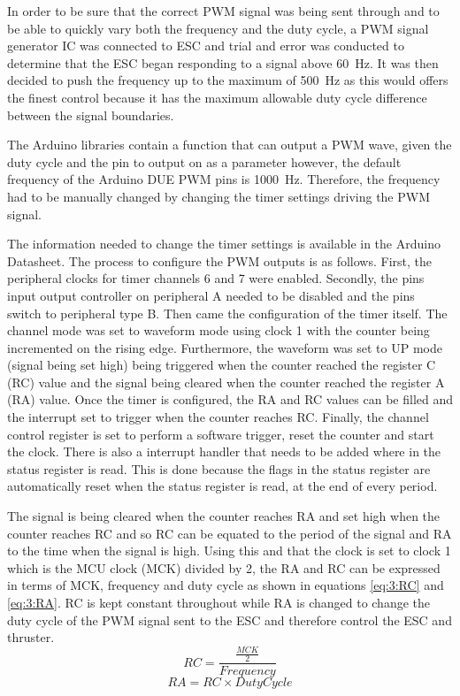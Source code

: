 		\vspace{0.4cm}
		In order to be sure that the correct PWM signal was being sent through and to be able to quickly vary both the frequency and the duty cycle, a PWM signal generator IC was connected to ESC and trial and error was conducted to determine that the ESC began responding to a signal above \SI{60}{\hertz}. It was then decided to push the frequency up to the maximum of \SI{500}{\hertz} as this would offers the finest control because it has the maximum allowable duty cycle difference between the signal boundaries.\par
		\vspace{0.4cm}
		The Arduino libraries contain a function that can output a PWM wave, given the duty cycle and the pin to output on as a parameter however, the default frequency of the Arduino DUE PWM pins is \SI{1000}{\hertz}. Therefore, the frequency had to be manually changed by changing the timer settings driving the PWM signal.\par
		\vspace{0.4cm}
		The information needed to change the timer settings is available in the Arduino Datasheet. The process to configure the PWM outputs is as follows. First, the peripheral clocks for timer channels 6 and 7 were enabled. Secondly, the pins input output controller on peripheral A needed to be disabled and the pins switch to peripheral type B. Then came the configuration of the timer itself. The channel mode was set to waveform mode using clock 1 with the counter being incremented on the rising edge. Furthermore, the waveform was set to UP mode (signal being set high) being triggered when the counter reached the register C (RC) value and the signal being cleared when the counter reached the register A (RA) value. Once the timer is configured, the RA and RC values can be filled and the interrupt set to trigger when the counter reaches RC. Finally, the channel control register is set to perform a software trigger, reset the counter and start the clock. There is also a interrupt handler that needs to be added where in the status register is read. This is done because the flags in the status register are automatically reset when the status register is read, at the end of every period.\par
		\vspace{0.4cm}
		The signal is being cleared when the counter reaches RA and set high when the counter reaches RC and so RC can be equated to the period of the signal and RA to the time when the signal is high. Using this and that the clock is set to clock 1 which is the MCU clock (MCK) divided by 2, the RA and RC can be expressed in terms of MCK, frequency and duty cycle as shown in equations \ref{eq:3:RC} and \ref{eq:3:RA}. RC is kept constant throughout while RA is changed to change the duty cycle of the PWM signal sent to the ESC and therefore control the ESC and thruster.
		\begin{equation}
			RC = \frac{\frac{MCK}{2}}{Frequency}
			\label{eq:3:RC}
		\end{equation}
		\begin{equation}
			RA = RC \times Duty Cycle
			\label{eq:3:RA}
		\end{equation}
		
